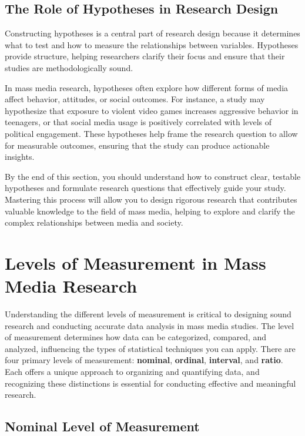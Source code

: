 \documentclass[
]{book}
\begin{document}
\subsection*{The Role of Hypotheses in Research Design}\label{the-role-of-hypotheses-in-research-design}

Constructing hypotheses is a central part of research design because it determines what to test and how to measure the relationships between variables. Hypotheses provide structure, helping researchers clarify their focus and ensure that their studies are methodologically sound.

In mass media research, hypotheses often explore how different forms of media affect behavior, attitudes, or social outcomes. For instance, a study may hypothesize that exposure to violent video games increases aggressive behavior in teenagers, or that social media usage is positively correlated with levels of political engagement. These hypotheses help frame the research question to allow for measurable outcomes, ensuring that the study can produce actionable insights.

By the end of this section, you should understand how to construct clear, testable hypotheses and formulate research questions that effectively guide your study. Mastering this process will allow you to design rigorous research that contributes valuable knowledge to the field of mass media, helping to explore and clarify the complex relationships between media and society.

\section{Levels of Measurement in Mass Media Research}\label{levels-of-measurement-in-mass-media-research}

Understanding the different levels of measurement is critical to designing sound research and conducting accurate data analysis in mass media studies. The level of measurement determines how data can be categorized, compared, and analyzed, influencing the types of statistical techniques you can apply. There are four primary levels of measurement: \textbf{nominal}, \textbf{ordinal}, \textbf{interval}, and \textbf{ratio}. Each offers a unique approach to organizing and quantifying data, and recognizing these distinctions is essential for conducting effective and meaningful research.

\subsection*{Nominal Level of Measurement}\label{nominal-level-of-measurement}
\end{document}
